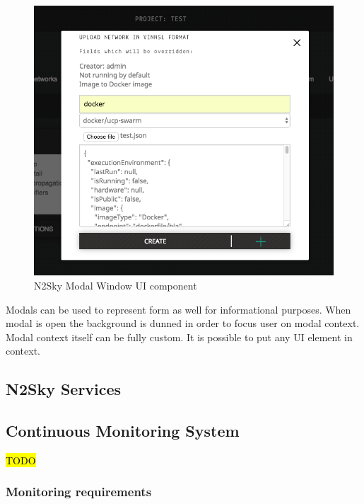 \begin{description}
 \begin{figure}[htbp]
\begin{center}
  \includegraphics[scale=0.65]{components/3/components/modal.png}
  \caption{N2Sky Modal Window UI component}
  \label{fig:modal}
\end{center}
\end{figure}

Modals can be used to represent form as well for informational purposes. When modal is open the background is dunned in order to focus user on modal context. Modal context itself can be fully custom. It is possible to put any UI element in context.



\end{description}



\subsection{N2Sky Services}\label{N2Sky Services}

\subsection{Continuous Monitoring System}\label{Continuous Monitoring System}
\hl{TODO}
\subsubsection{Monitoring requirements}\label{Monitoring requirements}

